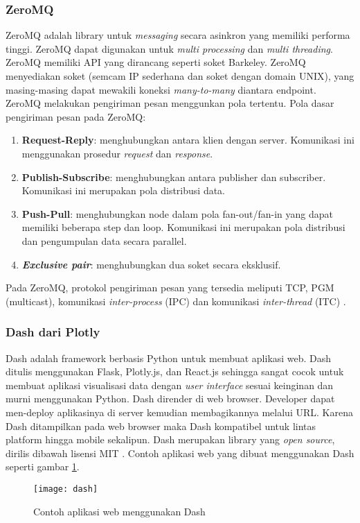 \documentclass[../thesis.tex]{subfiles}
\begin{document}
\subsubsection{ZeroMQ}
ZeroMQ adalah library untuk \textit{messaging} secara asinkron yang memiliki performa tinggi. ZeroMQ dapat digunakan untuk \textit{multi processing} dan \textit{multi threading}.
ZeroMQ memiliki API yang dirancang seperti soket Barkeley.
ZeroMQ menyediakan soket (semcam IP sederhana dan soket dengan domain UNIX), yang masing-masing dapat mewakili koneksi \textit{many-to-many} diantara endpoint. ZeroMQ melakukan pengiriman pesan menggunkan pola tertentu.
Pola dasar pengiriman pesan pada ZeroMQ:
\begin{enumerate}
	\item \textbf{Request-Reply}: menghubungkan antara klien dengan server. Komunikasi ini menggunakan prosedur \textit{request} dan \textit{response}.
	\item \textbf{Publish-Subscribe}: menghubungkan antara publisher dan subscriber. Komunikasi ini merupakan pola distribusi data.
	\item \textbf{Push-Pull}: menghubungkan node dalam pola fan-out/fan-in yang dapat memiliki beberapa step dan loop. Komunikasi ini merupakan pola distribusi dan pengumpulan data secara parallel. 
	\item \textbf{\textit{Exclusive pair}}: menghubungkan dua soket secara eksklusif.
\end{enumerate}
Pada ZeroMQ, protokol pengiriman pesan yang tersedia meliputi TCP, PGM (multicast), komunikasi \textit{inter-process} (IPC) dan komunikasi \textit{inter-thread} (ITC) \cite{ZeroMQ}.

\subsubsection{Dash dari Plotly}
Dash adalah framework berbasis Python untuk membuat aplikasi web. Dash ditulis menggunakan Flask, Plotly.js, dan React.js sehingga sangat cocok untuk membuat aplikasi visualisasi data dengan \textit{user interface} sesuai keinginan dan murni menggunakan Python. 
Dash dirender di web browser. Developer dapat men-deploy aplikasinya di server kemudian membagikannya melalui URL. Karena Dash ditampilkan pada web browser maka Dash kompatibel untuk lintas platform hingga mobile sekalipun. 
Dash merupakan library yang \textit{open source}, dirilis dibawah lisensi MIT \cite{Dash}. Contoh aplikasi web yang dibuat menggunakan Dash seperti gambar \ref{Dash}.
\begin{figure}[htp]
	\centering
	\texttt{[image: dash]}
	\caption{Contoh aplikasi web menggunakan Dash}
	\label{Dash}
\end{figure}
\end{document}

